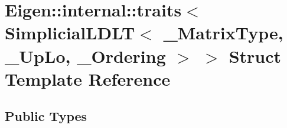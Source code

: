 \hypertarget{struct_eigen_1_1internal_1_1traits_3_01_simplicial_l_d_l_t_3_01___matrix_type_00_01___up_lo_00_01___ordering_01_4_01_4}{}\section{Eigen\+::internal\+::traits$<$ Simplicial\+L\+D\+LT$<$ \+\_\+\+Matrix\+Type, \+\_\+\+Up\+Lo, \+\_\+\+Ordering $>$ $>$ Struct Template Reference}
\label{struct_eigen_1_1internal_1_1traits_3_01_simplicial_l_d_l_t_3_01___matrix_type_00_01___up_lo_00_01___ordering_01_4_01_4}
\subsection*{Public Types}
